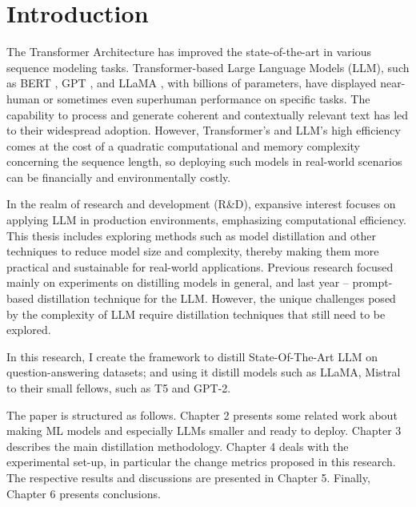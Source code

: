 \chapter{Introduction}
\label{chap:intro}

The Transformer Architecture \cite{attention} has improved the state-of-the-art in various sequence modeling tasks. Transformer-based Large Language Models (LLM), such as BERT \cite{bert}, GPT \cite{gpt}, and LLaMA \cite{llama,llama2}, with billions of parameters, have displayed near-human or sometimes even superhuman performance on specific tasks. The capability to process and generate coherent and contextually relevant text has led to their widespread adoption. However, Transformer's and LLM's high efficiency comes at the cost of a quadratic computational and memory complexity concerning the sequence length, so deploying such models in real-world scenarios can be financially and environmentally costly.

In the realm of research and development (R\&D), expansive interest focuses on applying LLM in production environments, emphasizing computational efficiency. This thesis includes exploring methods such as model distillation and other techniques to reduce model size and complexity, thereby making them more practical and sustainable for real-world applications. Previous research focused mainly on experiments on distilling models in general, and last year – prompt-based distillation technique for the LLM\@. However, the unique challenges posed by the complexity of LLM require distillation techniques that still need to be explored.

In this research, I create the framework to distill State-Of-The-Art LLM on question-answering datasets; and using it distill models such as LLaMA, Mistral \cite{mistral} to their small fellows, such as T5 \cite{t5} and GPT-2.

The paper is structured as follows. Chapter 2 presents some related work about making ML models and especially LLMs smaller and ready to deploy. Chapter 3 describes the main distillation methodology. Chapter 4 deals with the experimental set-up, in particular the change metrics proposed in this research. The respective results and discussions are presented in Chapter 5. Finally, Chapter 6 presents conclusions.
